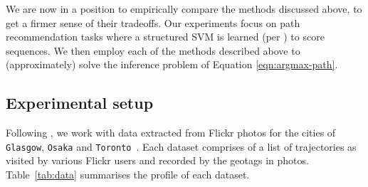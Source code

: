 
We are now in a position to empirically compare the methods discussed above,
to get a firmer sense of their tradeoffs.
Our experiments focus on path recommendation tasks where a structured SVM is learned (per \citet{Chen:2017}) to score sequences.
We then employ each of the methods described above to (approximately) solve the inference problem of Equation \ref{eqn:argmax-path}.

%
\subsection{Experimental setup}

Following \citet{cikm16paper,Chen:2017},
we work with
data
extracted from Flickr photos for the cities of {\tt Glasgow}, {\tt Osaka} and
{\tt Toronto}~\cite{ijcai15,cikm16paper}.
Each dataset comprises of a
list of trajectories as visited by various Flickr users and recorded by the geotags in photos.
Table~\ref{tab:data} summarises the profile of each dataset.


